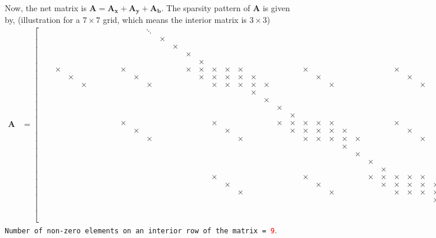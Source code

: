 \documentclass[12 pt, final]{article}
\renewcommand{\d}{\times}
\begin{document}
\begin{itemize}
\begin{itemize}
\begin{enumerate}
            Now, the net matrix is $\mathbf{A} = \mathbf{A_x}+\mathbf{A_y}+\mathbf{A_b}$. The sparsity pattern of $\mathbf{A}$ is given by, (illustration for a $7\times7$ grid, which means the interior matrix is $3\times3$)
            \begin{align*}
                \mathbf{A} &= \left[\begin{smallmatrix} 
                &&&&&&&&&&& \ddots\\
                &&&&&&&&&&&& \d\\
                &&&&&&&&&&&&& \d\\
                &&&&&&&&&&&&&& \d\\
                &&&&&&&&&&&&&&& \d\\
                &&\d&&&&&&&\d&&&&&\d&\d&\d&\d&\d&&&&&\d&&&&&&&\d \\
                &&&\d&&&&&&&\d&&&&&\d&\d&\d&\d&\d&&&&&\d&&&&&&&\d \\
                &&&&\d&&&&&&&\d&&&&&\d&\d&\d&\d&\d&&&&&\d&&&&&&&\d \\
                &&&&&&&&&&&&&&&&&&&\d\\
                &&&&&&&&&&&&&&&&&&&&\d\\
                &&&&&&&&&&&&&&&&&&&&&\d\\
                &&&&&&&&&&&&&&&&&&&&&&\d\\
                &&&&&&&&&\d&&&&&&&\d&&&&&\d&\d&\d&\d&\d&&&&&\d&&&&&&&\d \\
                &&&&&&&&&&\d&&&&&&&\d&&&&&\d&\d&\d&\d&\d&&&&&\d&&&&&&&\d \\
                &&&&&&&&&&&\d&&&&&&&\d&&&&&\d&\d&\d&\d&\d&&&&&\d&&&&&&&\d \\
                &&&&&&&&&&&&&&&&&&&&&&&&&& \d\\
                &&&&&&&&&&&&&&&&&&&&&&&&&&& \d\\ 
                &&&&&&&&&&&&&&&&&&&&&&&&&&&& \d\\
                &&&&&&&&&&&&&&&&&&&&&&&&&&&&& \d\\
                &&&&&&&&&&&&&&&&\d&&&&&&&\d&&&&&\d&\d&\d&\d&\d&&&&&\d&&&&&&&\d \\
                &&&&&&&&&&&&&&&&&\d&&&&&&&\d&&&&&\d&\d&\d&\d&\d&&&&&\d&&&&&&&\d \\
                &&&&&&&&&&&&&&&&&&\d&&&&&&&\d&&&&&\d&\d&\d&\d&\d&&&&&\d&&&&&&&\d \\
                &&&&&&&&&&&&&&&&&&&&&&&&&&&&&&&&&\d\\
                &&&&&&&&&&&&&&&&&&&&&&&&&&&&&&&&&&\d\\    
                &&&&&&&&&&&&&&&&&&&&&&&&&&&&&&&&&&&\ddots\\
                \end{smallmatrix}\right]
            \end{align*} 
            \texttt{Number of non-zero elements on an interior row of the matrix = \textcolor{red}{9}}.\\ 
            

\end{enumerate}
\end{itemize}
\end{itemize}
\end{document}
